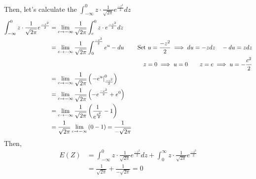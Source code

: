 \documentclass[11pt,oneside]{book}
\theoremstyle{break}
\theoremstyle{break}
\begin{document}
Then, let's calculate the $\int_{-\infty}^{0}z\cdot \frac{1}{\sqrt{2\pi}}e^{\frac{-z^2}{2}}dz$\begin{align*}
\int_{-\infty}^{0}z\cdot \frac{1}{\sqrt{2\pi}}e^{\frac{-z^2}{2}}&=\lim_{c\rightarrow -\infty}\frac{1}{\sqrt{2\pi}}\int_{c}^{0}z\cdot e^{\frac{-z^2}{2}}dz\\
&=\lim_{c\rightarrow -\infty}\frac{1}{\sqrt{2\pi}}\int_{0}^{\frac{-c^2}{2}} e^{u}-du &\text{Set }u=\frac{-z^2}{2}\implies du=-zdz\text{\quad}-du=zdz\\
&&z=0\implies u=0\text{\qquad} z=c\implies u=-\frac{c^2}{2}\\
&=\lim_{c\rightarrow -\infty}\frac{1}{\sqrt{2\pi}}\left( \left. -e^u\right|_{\frac{-c^2}{2}}^{0} \right)\\
&=\lim_{c\rightarrow -\infty}\frac{1}{\sqrt{2\pi}}\left(-e^{\frac{-c^2}{2}}+e^0 \right)\\
&=\lim_{c\rightarrow -\infty}\frac{1}{\sqrt{2\pi}}\left(\frac{1}{e^{\frac{c^2}{2}}}-1 \right)\\
&=\frac{1}{\sqrt{2\pi}}\lim_{c\rightarrow -\infty}\left(0-1 \right)=\frac{1}{-\sqrt{2\pi}}
\end{align*}
Then, \begin{align*}
E(Z)&=\int_{-\infty}^{0}z\cdot \frac{1}{\sqrt{2\pi}}e^{\frac{-z^2}{2}}dz+\int_{0}^{\infty}z\cdot \frac{1}{\sqrt{2\pi}}e^{\frac{-z^2}{2}}\\
&=\frac{1}{\sqrt{2\pi}}+\frac{1}{-\sqrt{2\pi}}=0
\end{align*}
\end{document}
